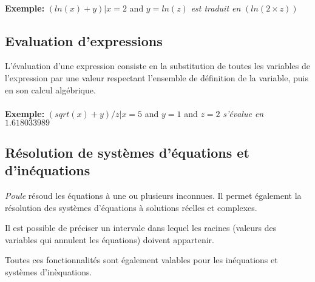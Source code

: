 \documentclass[french,12pt]{report}
\begin{document}
\paragraph{}
{\bf Exemple: }
\begin{math}
  (ln(x) + y) | x = 2 
\end{math}
 and 
\begin{math}
  y = ln(z)
\end{math}
{\it  est traduit en } 
\begin{math}
  (ln(2 \times z))
\end{math}


\subsection{Evaluation d'expressions}

L'\'evaluation d'une expression consiste  en la substitution de toutes
les variables de l'expression  par une valeur respectant l'ensemble de
d\'efinition de la variable, puis en son calcul alg\'ebrique.

\paragraph{}
{\bf Exemple: }
\begin{math}
  (sqrt(x) + y) / z | x = 5
\end{math}
and 
\begin{math}
  y = 1
\end{math}
and 
\begin{math}
  z = 2
\end{math}
{\it  s'\'evalue en } 
\begin{math}
  1.618 033 989
\end{math}

\subsection{R\'esolution de syst\`emes d'\'equations et d'in\'equations}

\emph{Poule} r\'esoud les \'equations  \`a une ou plusieurs inconnues.
Il permet \'egalement la r\'esolution des syst\`emes d'\'equations \`a
solutions r\'eelles et complexes.

Il est  possible de  pr\'eciser un intervale  dans lequel  les racines
(valeurs   des  variables  qui   annulent  les   \'equations)  doivent
appartenir.

Toutes  ces  fonctionnalit\'es  sont  \'egalement  valables  pour  les
in\'equations et syst\`emes d'in\`equations.
\end{document}
